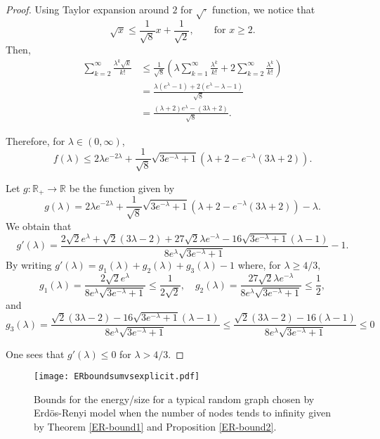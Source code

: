 \documentclass[a4paper]{article}
\newcommand{\R}{\mathbb{R}}
\theoremstyle{plain}
\begin{document}
\begin{proof}
Using Taylor expansion around \(2\) for $\sqrt{\cdot}$ function, we notice that
\[
    \sqrt{x} \leq \frac{1}{\sqrt{8}} x + \frac{1}{\sqrt{2}}, \qquad \mbox{for } x \geq 2.
\]
Then,
\begin{align*}
    \sum_{k = 2}^{\infty} \frac{\lambda^k\sqrt{k}}{k!} &\leq \frac{1}{\sqrt{8}}\left(\lambda\sum_{k = 1}^{\infty} \frac{\lambda^k}{k!} + 2\sum_{k = 2}^{\infty} \frac{\lambda^k}{k!}\right)\\
    &= \frac{\lambda(e^{\lambda} - 1) + 2(e^{\lambda} - \lambda - 1)}{\sqrt{8}}\\
    &= \frac{(\lambda + 2)e^{\lambda} - (3\lambda + 2)}{\sqrt{8}}.
\end{align*}

Therefore, for \(\lambda \in (0,\infty)\),
\[
    f(\lambda) \leq 2\lambda e^{-2\lambda} + \frac{1}{\sqrt{8}}\sqrt{3e^{-\lambda} + 1}\left(\lambda + 2 - e^{-\lambda}(3\lambda + 2)\right).
\]

Let \(g : \R_+ \to \R\) be the function given by
\[
    g(\lambda) = 2\lambda e^{-2\lambda} + \frac{1}{\sqrt{8}}\sqrt{3e^{-\lambda} + 1}\left(\lambda + 2 - e^{-\lambda}(3\lambda + 2)\right) - \lambda.
\]
We obtain that
\[
    g'(\lambda) = \frac{2\sqrt{2}e^{\lambda} + \sqrt{2}(3\lambda - 2) + 27\sqrt{2}\lambda e^{-\lambda} - 16\sqrt{3e^{-\lambda} + 1}(\lambda - 1)}{8e^{\lambda}\sqrt{3e^{-\lambda} + 1}} - 1.
\]
By writing $g'(\lambda)=g_1(\lambda)+ g_2(\lambda)+g_3(\lambda)-1$
where, for $\lambda\geq 4/3,$ $$g_1(\lambda)=\frac{2\sqrt{2}e^{\lambda}}{{8e^{\lambda}\sqrt{3e^{-\lambda} + 1}}}\leq \frac{1}{2\sqrt{2}},\quad  g_2(\lambda)=\frac{27\sqrt{2}\lambda e^{-\lambda}}{8e^{\lambda}\sqrt{3e^{-\lambda} + 1}}\leq \frac{1}{2}, $$
and
$$g_3(\lambda)=\frac{\sqrt{2}(3\lambda - 2) - 16\sqrt{3e^{-\lambda} + 1}(\lambda - 1)}{8e^{\lambda}\sqrt{3e^{-\lambda} + 1}} \leq \frac{\sqrt{2}(3\lambda - 2) - 16(\lambda - 1)}{8e^{\lambda}\sqrt{3e^{-\lambda} + 1}}\leq 0$$

One sees that $g'(\lambda)\leq0$ for \(\lambda>4/3\). 

\end{proof}

\begin{figure}[!ht]
    \centering
    \texttt{[image: ERboundsumvsexplicit.pdf]}
    \caption{Bounds for the energy/size for a typical random graph chosen by Erd\"os-Renyi model when the number of nodes tends to infinity given by Theorem \ref{ER-bound1} and Proposition \ref{ER-bound2}.}
\end{figure}
\end{document}
